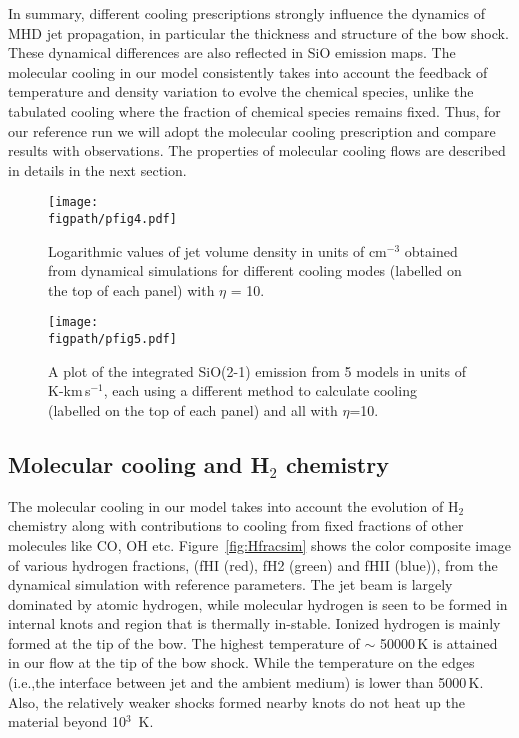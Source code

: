 \documentclass[useAMS,usenatbib]{mn2e}
\newcommand{\figpath}{../NEWFIGS}
\begin{document}
In summary, different cooling prescriptions strongly influence the
dynamics of MHD jet propagation, in particular the thickness and
structure of the bow shock. These dynamical differences are
also reflected in SiO emission maps. The molecular cooling in our
model consistently takes into account the feedback of temperature and
density variation to evolve the chemical species, unlike the tabulated cooling
where the fraction of chemical species remains fixed. Thus, for our reference
run we will adopt the molecular cooling prescription and compare
results with observations. The properties of
molecular cooling flows are described in details in the next section.

\begin{figure*}
 \texttt{[image: \\figpath/pfig4.pdf]}%
 \caption{Logarithmic values of jet volume density in units of
   cm$^{-3}$ obtained from dynamical simulations for different cooling
   modes (labelled on the top of each panel) with
   $\eta$ = 10.}
\label{fig:coolcmpdyn}
\end{figure*}

\begin{figure*}
 \texttt{[image: \\figpath/pfig5.pdf]}%
 \caption{A plot of the integrated SiO(2-1) emission from 5 models in
   units of K-km\,s$^{-1}$, 
each using a different method to calculate cooling (labelled on the
top of each panel) and all with $\eta$=10.}
\label{fig:coolcmpsio} 
\end{figure*}


\subsection{Molecular cooling and H$_2$ chemistry}
The molecular cooling in our
model takes into account the evolution of H$_2$ chemistry along with
contributions to cooling from fixed fractions of other molecules like
CO, OH etc. Figure~\ref{fig:Hfracsim} shows the color composite image
of various hydrogen fractions, (fHI (red), fH2 (green) and fHII
(blue)), from the dynamical simulation with
reference parameters. The jet beam is largely dominated by atomic
hydrogen, while molecular hydrogen is seen to be formed in internal
knots and region that is thermally in-stable. 
Ionized hydrogen is mainly formed at the tip of the bow. 
The highest temperature of $\sim$ 50000\,K is attained in our flow at the
tip of the bow shock. While the temperature on the edges (i.e.,the interface between
jet and the ambient medium) is lower than 5000\,K. Also, the relatively
weaker shocks formed nearby knots do not heat up the material beyond
10$^{3}$\, K. 
%
\end{document}
